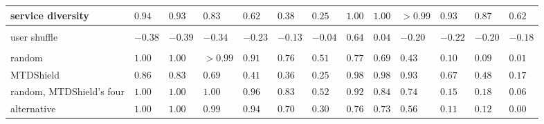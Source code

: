\begin{table}[htbp]
\begin{tabular}{@{}P{4.25cm}*{12}{>{\centering\arraybackslash}p{0.74cm}}@{}}
    \quad service diversity & $0.94$ & $0.93$ & $0.83$ & $0.62$ & $0.38$ & $0.25$ & $1.00$ & $1.00$ & ${>}0.99$ & $0.93$ & $0.87$ & $0.62$ \\
    \midrule
     \\
    \quad user shuffle & $-0.38$ & $-0.39$ & $-0.34$ & $-0.23$ & \textcolor{black!55}{$-0.13$} & \textcolor{black!55}{$-0.04$} & $0.64$ & \textcolor{black!55}{$0.04$} & $-0.20$ & $-0.22$ & $-0.20$ & $-0.18$ \\
    \midrule
     \\
    \quad random & $1.00$ & $1.00$ & ${>}0.99$ & $0.91$ & $0.76$ & $0.51$ & $0.77$ & $0.69$ & $0.43$ & $0.10$ & $0.09$ & \textcolor{black!55}{$0.01$} \\
    \quad MTDShield & $0.86$ & $0.83$ & $0.69$ & $0.41$ & $0.36$ & $0.25$ & $0.98$ & $0.98$ & $0.93$ & $0.67$ & $0.48$ & $0.17$ \\
    \quad random, MTDShield's four & $1.00$ & $1.00$ & $1.00$ & $0.96$ & $0.83$ & $0.52$ & $0.92$ & $0.84$ & $0.74$ & $0.15$ & $0.18$ & $0.06$ \\
    \quad alternative & $1.00$ & $1.00$ & $0.99$ & $0.94$ & $0.70$ & $0.30$ & $0.76$ & $0.73$ & $0.56$ & $0.11$ & $0.12$ & \textcolor{black!55}{$0.00$} \\
    \bottomrule
  \end{tabular}
\end{table}

